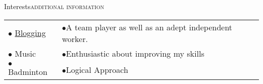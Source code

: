 \documentclass[letterpaper,10.9pt]{article}
\newcommand{\shortersection}[2]{\vspace{11pt}\scshape\raggedright\large{\color{black}\titlerule \vspace{-10pt}#1}\hfill\scshape\large{#2}}
\begin{document}
  

\shortersection{Interests}{additional information}

\vspace{6pt}
\begin{tabular}{p{11cm} p}
\small
$\bullet$ \color{blue}\href{https://medium.com/@sanchittanwar75}{Blogging} & 
\small
$\bullet$\hspace{2pt}A team player as well as an adept independent worker.\hfill \\
\small
$\bullet$ Music & 
\small
$\bullet$\hspace{2pt}Enthusiastic about improving my skills\hfill \\
\small
$\bullet$ Badminton & 
\small
 $\bullet$\hspace{2pt}Logical Approach\hfill
\end{tabular}
\end{document}
